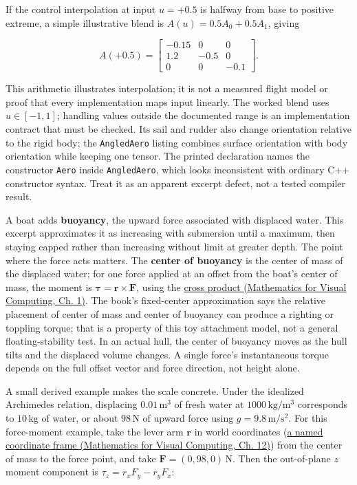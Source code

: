 If the control interpolation at input \(u=+0.5\) is halfway from base to positive extreme, a simple illustrative blend is \(A(u)=0.5A_0+0.5A_1\), giving

\[
A(+0.5)=\begin{bmatrix}-0.15&0&0\\1.2&-0.5&0\\0&0&-0.1\end{bmatrix}.
\]

This arithmetic illustrates interpolation; it is not a measured flight model or proof that every implementation maps input linearly. The worked blend uses \(u\in[-1,1]\); handling values outside the documented range is an implementation contract that must be checked. Its sail and rudder also change orientation relative to the rigid body; the \texttt{AngledAero} listing combines surface orientation with body orientation while keeping one tensor. The printed declaration names the constructor \texttt{Aero} inside \texttt{AngledAero}, which looks inconsistent with ordinary C++ constructor syntax. Treat it as an apparent excerpt defect, not a tested compiler result.

A boat adds \textbf{buoyancy}, the upward force associated with displaced water. This excerpt approximates it as increasing with submersion until a maximum, then staying capped rather than increasing without limit at greater depth. The point where the force acts matters. The \textbf{center of buoyancy} is the center of mass of the displaced water; for one force applied at an offset from the boat's center of mass, the moment is \(\boldsymbol{\tau}=\mathbf{r}\times\mathbf{F}\), using the \href{../02-Mathematics-for-Visual-Computing/main.pdf\#nameddest=01-foundations-i-ch017-the-cross-product-and-its-definition}{cross product (Mathematics for Visual Computing, Ch. 1)}. The book's fixed-center approximation says the relative placement of center of mass and center of buoyancy can produce a righting or toppling torque; that is a property of this toy attachment model, not a general floating-stability test. In an actual hull, the center of buoyancy moves as the hull tilts and the displaced volume changes. A single force's instantaneous torque depends on the full offset vector and force direction, not height alone.

A small derived example makes the scale concrete. Under the idealized Archimedes relation, displacing \(0.01\,\mathrm{m^3}\) of fresh water at \(1000\,\mathrm{kg/m^3}\) corresponds to \(10\,\mathrm{kg}\) of water, or about \(98\,\mathrm{N}\) of upward force using \(g=9.8\,\mathrm{m/s^2}\). For this force-moment example, take the lever arm \(\mathbf r\) in world coordinates (\href{../02-Mathematics-for-Visual-Computing/main.pdf\#nameddest=02-foundations-ii-ch028-higher-precision-and-local-coordinate-frames}{a named coordinate frame (Mathematics for Visual Computing, Ch. 12)}) from the center of mass to the force point, and take \(\mathbf F=(0,98,0)\,\mathrm{N}\). Then the out-of-plane \(z\) moment component is \(\tau_z=r_xF_y-r_yF_x\):

